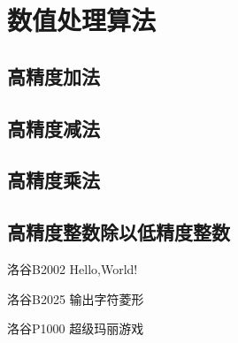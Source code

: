 \chapter{数值处理算法}
\section{高精度加法}
\section{高精度减法}
\section{高精度乘法}

\section{高精度整数除以低精度整数}

\begin{problemset}
\item 洛谷B2002 Hello,World!
\item 洛谷B2025 输出字符菱形
\item 洛谷P1000 超级玛丽游戏
\end{problemset}


